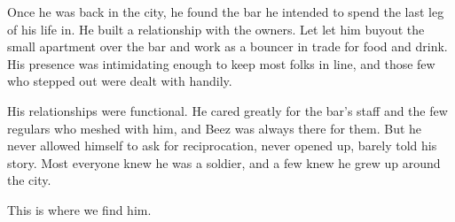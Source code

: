 Once he was back in the city, he found the bar he intended to spend the last leg of his life in. He built a relationship with the owners. Let let him buyout the small apartment over the bar and work as a bouncer in trade for food and drink. His presence was intimidating enough to keep most folks in line, and those few who stepped out were dealt with handily.

His relationships were functional. He cared greatly for the bar’s staff and the few regulars who meshed with him, and Beez was always there for them. But he never allowed himself to ask for reciprocation, never opened up, barely told his story. Most everyone knew he was a soldier, and a few knew he grew up around the city.

This is where we find him.


